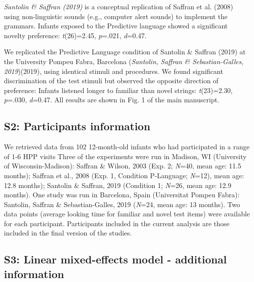 \begin{appendix}
\emph{Santolin \& Saffran (2019)} is a conceptual replication of Saffran
et al. (2008) using non-linguistic sounds (e.g., computer alert sounds)
to implement the grammars. Infants exposed to the Predictive language
showed a significant novelty preference: \emph{t}(26)=2.45,
\emph{p}=.021, \emph{d}=0.47.

We replicated the Predictive Language condition of Santolin \& Saffran
(2019) at the University Pompeu Fabra, Barcelona (\emph{Santolin,
Saffran \& Sebastian-Galles, 2019})(2019), using identical stimuli and
procedures. We found significant discrimination of the test stimuli but
observed the opposite direction of preference: Infants listened longer
to familiar than novel strings: \emph{t}(23)=2.30, \emph{p}=.030,
\emph{d}=0.47. All results are shown in Fig. 1 of the main manuscript.

\hypertarget{s2-participants-information}{%
\subsection{S2: Participants
information}\label{s2-participants-information}}

We retrieved data from 102 12-month-old infants who had participated in
a range of 1-6 HPP visits Three of the experiments were run in Madison,
WI (University of Wisconsin-Madison): Saffran \& Wilson, 2003 (Exp. 2;
\emph{N}=40, mean age: 11.5 months); Saffran et al., 2008 (Exp. 1,
Condition P-Language; \emph{N}=12), mean age: 12.8 months); Santolin \&
Saffran, 2019 (Condition 1; \emph{N}=26, mean age: 12.9 months). One
study was run in Barcelona, Spain (Universitat Pompeu Fabra): Santolin,
Saffran \& Sebastian-Galles, 2019 (\emph{N}=24, mean age: 13 months).
Two data points (average looking time for familiar and novel test items)
were available for each participant. Participants included in the
current analysis are those included in the final version of the studies.

\hypertarget{s3-linear-mixed-effects-model---additional-information}{%
\subsection{S3: Linear mixed-effects model - additional
information}\label{s3-linear-mixed-effects-model---additional-information}}


\end{appendix}
